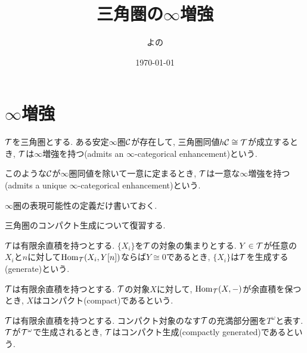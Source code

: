 \documentclass[uplatex, a4paper, 14Q, dvipdfmx]{jsarticle}
\title{三角圏の\texorpdfstring{$\infty$}{infty}増強}
\author{よの}
\date{\today}
\begin{document}
\maketitle

\begin{abstract}

\end{abstract}

\tableofcontents

\section{\texorpdfstring{$\infty$}{infty}増強}

\begin{definition}
  $\mathcal{T}$を三角圏とする. 
  ある安定$\infty$圏$\mathcal{C}$が存在して, 三角圏同値$h\mathcal{C} \cong \mathcal{T}$が成立するとき, $\mathcal{T}$は$\infty$増強を持つ(admits an $\infty$-categorical enhancement)という.

  このような$\mathcal{C}$が$\infty$圏同値を除いて一意に定まるとき, $\mathcal{T}$は一意な$\infty$増強を持つ(admits a unique $\infty$-categorical enhancement)という.
\end{definition}

$\infty$圏の表現可能性の定義だけ書いておく.

\begin{definition}[表現可能]
  
\end{definition}

三角圏のコンパクト生成について復習する.

\begin{definition}[生成する]
  $\mathcal{T}$は有限余直積を持つとする. 
  $\{X_i\}$を$\mathcal{T}$の対象の集まりとする.
  $Y \in \mathcal{T}$が任意の$X_i$と$n$に対して$\mathrm{Hom}_{\mathcal{T}}(X_i,Y[n])$ならば$Y \cong 0$であるとき, $\{X_i\}$は$\mathcal{T}$を生成する(generate)という. 
\end{definition}

\begin{definition}[コンパクト]
  $\mathcal{T}$は有限余直積を持つとする. 
  $\mathcal{T}$の対象$X$に対して, $\mathrm{Hom}_{\mathcal{T}}(X,-)$が余直積を保つとき, $X$はコンパクト(compact)であるという.
\end{definition}

\begin{definition}[コンパクト生成]
  $\mathcal{T}$は有限余直積を持つとする. 
  コンパクト対象のなす$\mathcal{T}$の充満部分圏を$T^\omega$と表す. 
  $\mathcal{T}$が$\mathcal{T}^\omega$で生成されるとき, $\mathcal{T}$はコンパクト生成(compactly generated)であるという. 
\end{definition}
\end{document}
